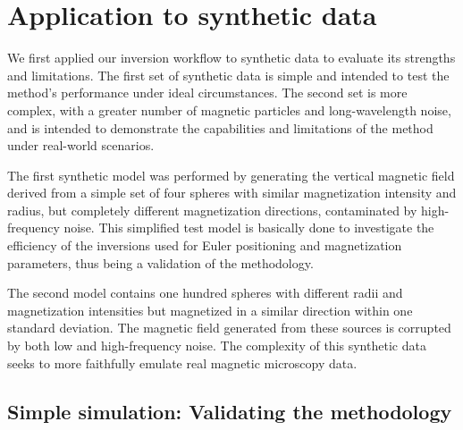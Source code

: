 \section{Application to synthetic data}

We first applied our inversion workflow to synthetic data to evaluate its
strengths and limitations. The first set of synthetic data is simple and
intended to test the method's performance under ideal circumstances. The second
set is more complex, with a greater number of magnetic particles and
long-wavelength noise, and is intended to demonstrate the capabilities and
limitations of the method under real-world scenarios.

The first synthetic model was performed by generating the vertical magnetic
field derived from a simple set of four spheres with similar magnetization
intensity and radius, but completely different magnetization directions,
contaminated by high-frequency noise. This simplified test model is basically
done to investigate the efficiency of the inversions used for Euler positioning
and magnetization parameters, thus being a validation of the methodology.

The second model contains one hundred spheres with different radii and
magnetization intensities but magnetized in a similar direction within one
standard deviation. The magnetic field generated from these sources is
corrupted by both low and high-frequency noise. The complexity of this
synthetic data seeks to more faithfully emulate real magnetic microscopy data.


\subsection{Simple simulation: Validating the methodology}

